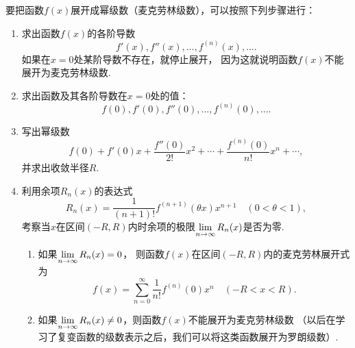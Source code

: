 要把函数\(f(x)\)展开成幂级数（麦克劳林级数），可以按照下列步骤进行：
\begin{enumerate}
\item 求出函数\(f(x)\)的各阶导数\[
f'(x),f''(x),\dotsc,f^{(n)}(x),\dotsc.
\]
如果在\(x=0\)处某阶导数不存在，就停止展开，%
因为这就说明函数\(f(x)\)不能展开为麦克劳林级数.

\item 求出函数及其各阶导数在\(x=0\)处的值：\[
f(0),f'(0),f''(0),\dotsc,f^{(n)}(0),\dotsc.
\]

\item 写出幂级数\[
f(0) + f'(0) x + \frac{f''(0)}{2!} x^2 + \dotsb + \frac{f^{(n)}(0)}{n!} x^n + \dotsb,
\]
并求出收敛半径\(R\).

\item 利用余项\(R_n(x)\)的表达式\[
R_n(x) = \frac{1}{(n+1)!} f^{(n+1)}(\theta x) x^{n+1}
\quad(0 < \theta < 1),
\]
考察当\(x\)在区间\((-R,R)\)内时余项的极限\(\lim\limits_{n\to\infty} R_n(x)\)是否为零.
\begin{enumerate}
	\item 如果\(\lim\limits_{n\to\infty} R_n(x) = 0\)，%
则函数\(f(x)\)在区间\((-R,R)\)内的麦克劳林展开式为
\[
f(x) = \sum\limits_{n=0}^\infty \frac{1}{n!} f^{(n)}(0) x^n
\quad(-R < x < R).
\]
	\item 如果\(\lim\limits_{n\to\infty} R_n(x) \neq 0\)，则函数\(f(x)\)不能展开为麦克劳林级数%
	（以后在学习了复变函数的级数表示之后，我们可以将这类函数展开为罗朗级数）.
\end{enumerate}
\end{enumerate}

